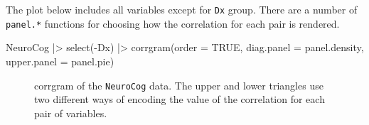 \documentclass[
  letterpaper,
  10pt,
  krantz2]{krantz}
\makeatletter
\newenvironment{Shaded}{\begin{snugshade}}{\end{snugshade}}
\newcommand{\AttributeTok}[1]{\textcolor[rgb]{0.40,0.45,0.13}{#1}}
\newcommand{\ConstantTok}[1]{\textcolor[rgb]{0.56,0.35,0.01}{#1}}
\newcommand{\FunctionTok}[1]{\textcolor[rgb]{0.28,0.35,0.67}{#1}}
\newcommand{\NormalTok}[1]{\textcolor[rgb]{0.00,0.23,0.31}{#1}}
\newcommand{\SpecialCharTok}[1]{\textcolor[rgb]{0.37,0.37,0.37}{#1}}
\newenvironment{kframe}{%
  \medskip{}
  \setlength{\fboxsep}{.8em}
  \def\at@end@of@kframe{}%
  \ifinner\ifhmode%
  \def\at@end@of@kframe{\end{minipage}}%
  \begin{minipage}{\columnwidth}%
  \fi\fi%
  \def\FrameCommand##1{\hskip\@totalleftmargin \hskip-\fboxsep
  \colorbox{shadecolor}{##1}\hskip-\fboxsep
      \hskip-\linewidth \hskip-\@totalleftmargin \hskip\columnwidth}%
  \MakeFramed {\advance\hsize-\width
    \@totalleftmargin\z@ \linewidth\hsize
    \@setminipage}}%
{\par\unskip\endMakeFramed%
  \at@end@of@kframe}
\renewenvironment{Shaded}{\begin{kframe}}{\end{kframe}}
\makeatother
\begin{document}
The plot below includes all variables except for \texttt{Dx} group.
There are a number of \texttt{panel.*} functions for choosing how the
correlation for each pair is rendered.

\begin{Shaded}
\begin{Highlighting}[]
\NormalTok{NeuroCog }\SpecialCharTok{|\textgreater{}}
  \FunctionTok{select}\NormalTok{(}\SpecialCharTok{{-}}\NormalTok{Dx) }\SpecialCharTok{|\textgreater{}}
  \FunctionTok{corrgram}\NormalTok{(}\AttributeTok{order =} \ConstantTok{TRUE}\NormalTok{,}
           \AttributeTok{diag.panel =}\NormalTok{ panel.density,}
           \AttributeTok{upper.panel =}\NormalTok{ panel.pie)}
\end{Highlighting}
\end{Shaded}

\begin{figure}[H]


\caption{\label{fig-NC-corrgram}corrgram of the \texttt{NeuroCog} data.
The upper and lower triangles use two different ways of encoding the
value of the correlation for each pair of variables.}

\end{figure}%
\end{document}
